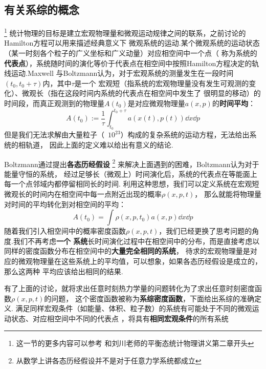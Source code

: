     \subsection{有关系综的概念}\footnote{这一节的更多内容可以参考\cite{Tuckerman2010Statistical}
    和刘川老师的平衡态统计物理讲义第二章开头}
    统计物理的目标是建立宏观物理量和微观运动规律之间的联系，之前讨论的Hamilton方程可以用来描述经典意义下
    微观系统的运动.某个微观系统的运动状态（某一时刻各个粒子的广义坐标和广义动量）对应相空间中一个点（
    称为系统的\textbf{代表点}），系统随时间的演化等价于代表点在相空间中按照Hamilton方程决定的轨线运动.Maxwell
    与Boltzmann认为，对于宏观系统的测量发生在一段时间$(t_0, t_0 + \tau)$内，其中$\tau$是一个
    宏观短（指系统的宏观物理量没有发生可观测的变化）、微观长（指在这段时间内系统的代表点在相空间中发生了
    很明显的移动）的时间段，而真正观测到的物理量$A(t_0)$是对应微观物理量$a(x,p)$的\textbf{时间平均}：
    \begin{equation}
        A(t_0) := \frac{1}{\tau}\int_{t_0}^{t_0+\tau}a(x(t), p(t))\dd x\dd p
    \end{equation}
    但是我们无法求解由大量粒子（~$10^{23}$）构成的复杂系统的运动方程，无法给出系统的相轨道，
    因此上面的定义难以给出有意义的结论.
    \par 
    Boltzmann通过提出\textbf{各态历经假设}
    \footnote{从数学上讲各态历经假设并不是对于任意力学系统都成立}
    来解决上面遇到的困难，Boltzmann认为对于能量守恒的系统，
    经过足够长（微观上）时间演化后，系统的代表点在等能面上每一个点邻域内都停留相同长的时间.
    利用这种思想，我们可以定义系统在宏观短微观长的时间内在相空间中每一点附近出现的概率$\rho(x, p, t)$，
    那么就能将物理量对时间的平均转化到对相空间的平均：
    \begin{equation}
        A(t_0) = \int\rho(x, p, t_0)a(x, p)\dd x\dd p
    \end{equation}
    随着我们引入相空间中的概率密度函数$\rho(x, p, t)$，我们已经更换了思考问题的角度.我们不再考虑\textbf{一个
    系统}长时间演化过程中在相空间中的分布，而是直接考虑以同样的密度函数分布在相空间中的\textbf{大量完全相同的系统}，
    待求的宏观物理量是对应的微观物理量在这些系统上的平均值，可以想象，如果各态历经假设是成立的，那么这两种
    平均应该给出相同的结果.
    \par 
    有了上面的讨论，就将求出任意时刻热力学量的问题转化为了求出任意时刻密度函数$\rho(x, p, t)$的问题，
    这个密度函数被称为\textbf{系综密度函数}，下面给出系综的准确定义.
    满足同样宏观条件（如能量、体积、粒子数）的系统有可能处于不同的微观运动状态、对应相空间中不同的代表点
    ，将具有\textbf{相同宏观条件}的所有系统
